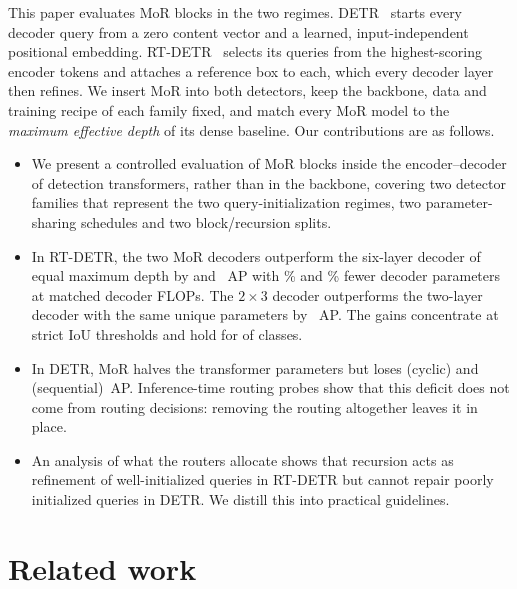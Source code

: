 \documentclass[pdflatex,iicol,sn-basic,Numbered]{sn-jnl}
\newcommand{\x}{\ensuremath{\times}}
\begin{document}
This paper evaluates MoR blocks in the two regimes. DETR~\cite{carion2020detr} starts every decoder query from a zero content vector and a learned, input-independent positional embedding. RT-DETR~\cite{zhao2024rtdetr} selects its queries from the highest-scoring encoder tokens and attaches a reference box to each, which every decoder layer then refines. We insert MoR into both detectors, keep the backbone, data and training recipe of each family fixed, and match every MoR model to the \emph{maximum effective depth} of its dense baseline. Our contributions are as follows.
\begin{itemize}
\item We present a controlled evaluation of MoR blocks inside the encoder--decoder of detection transformers, rather than in the backbone, covering two detector families that represent the two query-initialization regimes, two parameter-sharing schedules and two block/recursion splits.
\item In RT-DETR, the two MoR decoders outperform the six-layer decoder of equal maximum depth by  and ~AP with \% and \% fewer decoder parameters at matched decoder FLOPs. The $2\x3$ decoder outperforms the two-layer decoder with the same unique parameters by ~AP. The gains concentrate at strict IoU thresholds and hold for  of  classes.
\item In DETR, MoR halves the transformer parameters but loses  (cyclic) and  (sequential)~AP. Inference-time routing probes show that this deficit does not come from routing decisions: removing the routing altogether leaves it in place.
\item An analysis of what the routers allocate shows that recursion acts as refinement of well-initialized queries in RT-DETR but cannot repair poorly initialized queries in DETR. We distill this into practical guidelines.
\end{itemize}

\section{Related work}\label{sec:related}
\end{document}
